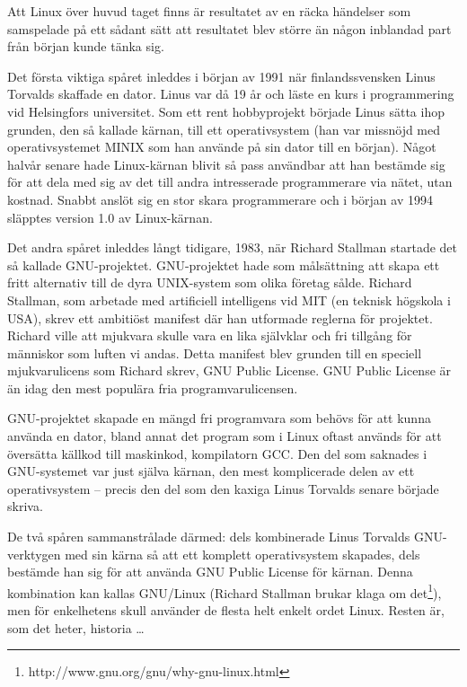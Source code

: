 \documentclass[a4paper,final]{memoir} %
\begin{document}
Att Linux över huvud taget finns är resultatet av en räcka händelser som samspelade på ett sådant sätt att resultatet blev större än någon inblandad part från början kunde tänka sig.

Det första viktiga spåret inleddes i början av 1991 när finlandssvensken Linus Torvalds skaffade en dator. Linus var då 19 år och läste en kurs i programmering vid Helsingfors universitet. Som ett rent hobbyprojekt började Linus sätta ihop grunden, den så kallade kärnan, till ett operativsystem (han var missnöjd med operativsystemet MINIX som han använde på sin dator till en början). Något halvår senare hade Linux-kärnan blivit så pass användbar att han bestämde sig för att dela med sig av det till andra intresserade programmerare via nätet, utan kostnad. Snabbt anslöt sig en stor skara programmerare och i början av 1994 släpptes version 1.0 av Linux-kärnan. 

Det andra spåret inleddes långt tidigare, 1983, när Richard Stallman startade det så kallade GNU-projektet. GNU-projektet hade som målsättning att skapa ett fritt alternativ till de dyra UNIX-system som olika företag sålde. Richard Stallman, som arbetade med artificiell intelligens vid MIT (en teknisk högskola i USA), skrev ett ambitiöst manifest där han utformade reglerna för projektet. Richard ville att mjukvara skulle vara en lika självklar och fri tillgång för människor som luften vi andas. Detta manifest blev grunden till en speciell mjukvarulicens som Richard skrev, GNU Public License. GNU Public License är än idag den mest populära fria programvarulicensen.

GNU-projektet skapade en mängd fri programvara som behövs för att kunna använda en dator, bland annat det program som i Linux oftast används för att översätta källkod till maskinkod, kompilatorn GCC. Den del som saknades i GNU-systemet var just själva kärnan, den mest komplicerade delen av ett operativsystem -- precis den del som den kaxiga Linus Torvalds senare började skriva. 

De två spåren sammanstrålade därmed: dels kombinerade Linus Torvalds GNU-verktygen med sin kärna så att ett komplett operativsystem skapades, dels bestämde han sig för att använda GNU Public License för kärnan. Denna kombination kan kallas GNU/Linux (Richard Stallman brukar klaga om det\footnote{http://www.gnu.org/gnu/why-gnu-linux.html}), men för enkelhetens skull använder de flesta helt enkelt ordet Linux. Resten är, som det heter, historia \ldots{}
\end{document}
